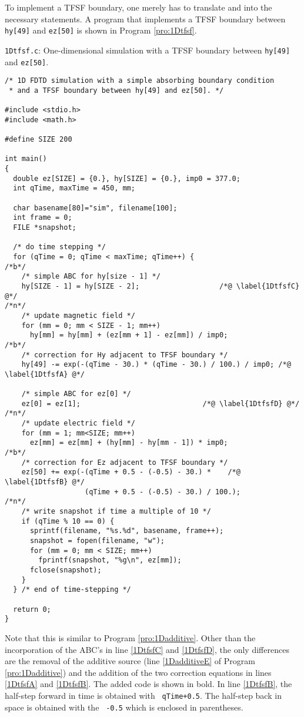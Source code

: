 To implement a TFSF boundary, one merely has to translate
 and  into the
necessary statements.  A program that implements a TFSF boundary
between {\tt hy[49]} and {\tt ez[50]} is shown in Program
\ref{pro:1Dtfsf}.
\begin{program}
{\tt 1Dtfsf.c}: 
One-dimensional simulation with a TFSF boundary between {\tt hy[49]}
and {\tt ez[50]}. \label{pro:1Dtfsf}
\codemiddle
\begin{lstlisting}
/* 1D FDTD simulation with a simple absorbing boundary condition
 * and a TFSF boundary between hy[49] and ez[50]. */

#include <stdio.h>
#include <math.h>

#define SIZE 200

int main()
{
  double ez[SIZE] = {0.}, hy[SIZE] = {0.}, imp0 = 377.0;
  int qTime, maxTime = 450, mm;

  char basename[80]="sim", filename[100];
  int frame = 0;
  FILE *snapshot;

  /* do time stepping */
  for (qTime = 0; qTime < maxTime; qTime++) {
/*b*/
    /* simple ABC for hy[size - 1] */
    hy[SIZE - 1] = hy[SIZE - 2];                   /*@ \label{1DtfsfC} @*/
/*n*/
    /* update magnetic field */
    for (mm = 0; mm < SIZE - 1; mm++)
      hy[mm] = hy[mm] + (ez[mm + 1] - ez[mm]) / imp0;
/*b*/
    /* correction for Hy adjacent to TFSF boundary */
    hy[49] -= exp(-(qTime - 30.) * (qTime - 30.) / 100.) / imp0; /*@ \label{1DtfsfA} @*/

    /* simple ABC for ez[0] */
    ez[0] = ez[1];                             /*@ \label{1DtfsfD} @*/
/*n*/
    /* update electric field */
    for (mm = 1; mm<SIZE; mm++)
      ez[mm] = ez[mm] + (hy[mm] - hy[mm - 1]) * imp0;
/*b*/
    /* correction for Ez adjacent to TFSF boundary */
    ez[50] += exp(-(qTime + 0.5 - (-0.5) - 30.) *    /*@ \label{1DtfsfB} @*/
                   (qTime + 0.5 - (-0.5) - 30.) / 100.);
/*n*/
    /* write snapshot if time a multiple of 10 */
    if (qTime % 10 == 0) {
      sprintf(filename, "%s.%d", basename, frame++);
      snapshot = fopen(filename, "w");
      for (mm = 0; mm < SIZE; mm++)
        fprintf(snapshot, "%g\n", ez[mm]);
      fclose(snapshot);
    }
  } /* end of time-stepping */

  return 0;
}
\end{lstlisting}
\end{program}
Note that this is similar to Program \ref{pro:1Dadditive}.  Other than
the incorporation of the ABC's in line \ref{1DtfsfC} and
\ref{1DtfsfD}, the only differences are the removal of the additive
source (line \ref{1DadditiveE} of Program \ref{pro:1Dadditive}) and
the addition of the two correction equations in lines \ref{1DtfsfA}
and \ref{1DtfsfB}.  The added code is shown in bold.  In line
\ref{1DtfsfB}, the half-step forward in time is obtained with {\tt
qTime+0.5}.  The half-step back in space is obtained with the {\tt
-0.5} which is enclosed in parentheses.

